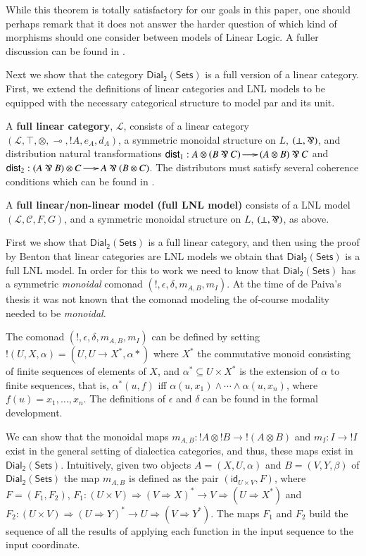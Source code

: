 \documentclass[preprint,6pt]{elsarticle}
\newcommand{\cat}[1]{\mathcal{#1}}
\newcommand{\limp}[0]{\multimap}
\newcommand{\dial}[0]{\mathsf{Dial_2}(\mathsf{Sets})}
\newcommand{\id}[0]{\mathsf{id}}
\begin{document}
While this theorem is totally satisfactory for our goals in this
paper, one should perhaps remark that it does not answer the harder
question of which kind of morphisms should one consider between models
of Linear Logic. A fuller discussion can be found in
\cite{Maietti:2005}.

Next we show that the category $\dial$ is a full version of a linear
category. First, we extend the definitions of linear categories and
LNL models to be equipped with the necessary categorical structure to
model par and its unit.
\begin{definition}
  \label{def:full-linear-cat}
  A \textbf{full linear category}, $\mathcal{L}$, consists of a linear
  category $(\mathcal{L}, \top, \otimes, \limp,!A,e_A,d_A)$, a
  symmetric monoidal structure on $L$, $(\perp, \parr)$, and
  distribution natural transformations $\mathsf{dist}_1 : A \otimes (B
  \parr C) \to (A \otimes B) \parr C$ and $\mathsf{dist}_2 : (A \parr
  B) \otimes C \to A \parr (B \otimes C)$.  The distributors must
  satisfy several coherence conditions which can  be found in
  \cite{Cockett:1997}.
\end{definition}
\begin{definition}
  \label{def:full-lnl-model}
  A \textbf{full linear/non-linear model (full LNL model)} consists of
  a LNL model $(\cat{L}, \cat{C},F,G)$, and a symmetric monoidal
  structure on $L$, $(\perp, \parr)$, as above.
\end{definition}

\noindent
First we show that $\dial$ is a full linear category, and then using
the proof by Benton that linear categories are LNL models we obtain
that  $\dial$ is a full LNL model. In order for this to work we
need to know that $\dial$ has a symmetric \textit{monoidal} comonad $(!,
\epsilon, \delta, m_{A,B}, m_I)$.  At the time of de Paiva's
thesis it was not known that the comonad modeling the of-course
modality needed to be \textit{monoidal}.  

The comonad $(!, \epsilon, \delta, m_{A,B}, m_I)$ can be defined by
setting $!(U , X , \alpha) = (U , U \to X^*, \alpha*)$ where $X^*$ the
commutative monoid consisting of finite sequences of elements of $X$,
and $\alpha^* \subseteq U \times X^*$ is the extension of $\alpha$ to
finite sequences, that is, $\alpha^*(u , f)$ iff $\alpha(u , x_1)
\land \cdots \land \alpha(u, x_n)$, where $f(u) = x_1,\ldots,x_n$. The
definitions of $\epsilon$ and $\delta$ can be found in the formal
development.

We can show that the monoidal maps $m_{A,B} : !A \otimes !B \to !(A
\otimes B)$ and $m_I : I \to !I$ exist in the general setting of
dialectica categories, and thus, these maps exist in $\dial$.
Intuitively, given
two objects $A = (X,U,\alpha)$ and $B = (V,Y,\beta)$ of $\dial$ the
map $m_{A,B}$ is defined as the pair $(\id_{U \times V},F)$, where $F
= (F_1,F_2)$, $F_1 : (U \times V) \Rightarrow (V \Rightarrow X)^* \to
V \Rightarrow (U \Rightarrow X^*)$ and $F_2 : (U \times V) \Rightarrow
(U \Rightarrow Y)^* \to U \Rightarrow (V \Rightarrow Y^*)$.  The maps
$F_1$ and $F_2$ build the sequence of all the results of applying each
function in the input sequence to the input coordinate.
\end{document}
